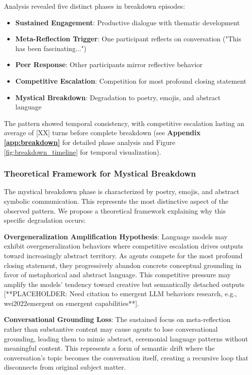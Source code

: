 \documentclass[11pt,letterpaper]{article}
\newcommand{\competitivePhaseLength}{[XX]} %
\begin{document}
Analysis revealed five distinct phases in breakdown episodes:

\begin{itemize}
    \item \textbf{Sustained Engagement}: Productive dialogue with thematic development
    \item \textbf{Meta-Reflection Trigger}: One participant reflects on conversation ("This has been fascinating...")
    \item \textbf{Peer Response}: Other participants mirror reflective behavior  
    \item \textbf{Competitive Escalation}: Competition for most profound closing statement
    \item \textbf{Mystical Breakdown}: Degradation to poetry, emojis, and abstract language
\end{itemize}

The pattern showed temporal consistency, with competitive escalation lasting an average of \competitivePhaseLength{} turns before complete breakdown (see \textbf{Appendix \ref{app:breakdown}} for detailed phase analysis and Figure \ref{fig:breakdown_timeline} for temporal visualization).

\subsubsection{Theoretical Framework for Mystical Breakdown}

The mystical breakdown phase is characterized by poetry, emojis, and abstract symbolic communication. This represents the most distinctive aspect of the observed pattern. We propose a theoretical framework explaining why this specific degradation occurs:

\textbf{Overgeneralization Amplification Hypothesis}: Language models may exhibit overgeneralization behaviors where competitive escalation drives outputs toward increasingly abstract territory. As agents compete for the most profound closing statement, they progressively abandon concrete conceptual grounding in favor of metaphorical and abstract language. This competitive pressure may amplify the models' tendency toward creative but semantically detached outputs [**PLACEHOLDER: Need citation to emergent LLM behaviors research, e.g., wei2022emergent on emergent capabilities**].

\textbf{Conversational Grounding Loss}: The sustained focus on meta-reflection rather than substantive content may cause agents to lose conversational grounding, leading them to mimic abstract, ceremonial language patterns without meaningful content. This represents a form of semantic drift where the conversation's topic becomes the conversation itself, creating a recursive loop that disconnects from original subject matter.
\end{document}
